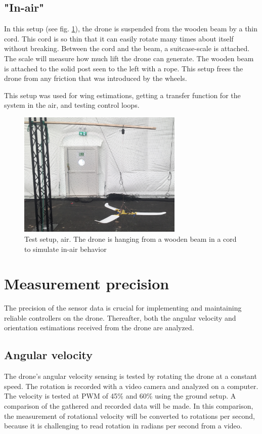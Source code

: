 \subsection{"In-air"}
In this setup (see fig. \ref{fig:testsetup_air}), the drone is suspended from the wooden beam by a thin cord. This cord is so thin that it can easily rotate many times about itself without breaking. Between the cord and the beam, a suitcase-scale is attached. The scale will measure how much lift the drone can generate. The wooden beam is attached to the solid post seen to the left with a rope. 
This setup frees the drone from any friction that was introduced by the wheels. 

This setup was used for wing estimations, getting a transfer function for the system in the air, and testing control loops. 

\begin{figure}[h]
    \centering
    \includegraphics[width=0.7\textwidth]{figures/results/testsetup_air.jpeg}
    \caption{Test setup, air. The drone is hanging from a wooden beam in a cord to simulate in-air behavior}
    \label{fig:testsetup_air}
\end{figure}

\section{Measurement precision}\label{results:measurementprecision}
The precision of the sensor data is crucial for implementing and maintaining reliable controllers on the drone. Thereafter, both the angular velocity and orientation estimations received from the drone are analyzed. 


\subsection{Angular velocity}
The drone's angular velocity sensing is tested by rotating the drone at a constant speed. The rotation is recorded with a video camera and analyzed on a computer. The velocity is tested at PWM of 45\% and 60\% using the ground setup. A comparison of the gathered and recorded data will be made. In this comparison, the measurement of rotational velocity will be converted to rotations per second, because it is challenging to read rotation in radians per second from a video. 

